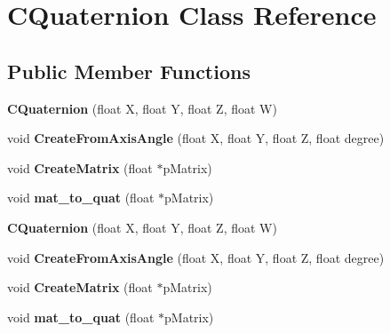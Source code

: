 \hypertarget{class_c_quaternion}{}\section{C\+Quaternion Class Reference}
\label{class_c_quaternion}
\subsection*{Public Member Functions}
\begin{DoxyCompactItemize}
\item 
\mbox{\label{class_c_quaternion_a899e2c8c9719a2548ad4c8997c6e46a7}} 
{\bfseries C\+Quaternion} (float X, float Y, float Z, float W)
\item 
\mbox{\label{class_c_quaternion_a364b4fbccd362ccf7c639317273207e3}} 
void {\bfseries Create\+From\+Axis\+Angle} (float X, float Y, float Z, float degree)
\item 
\mbox{\label{class_c_quaternion_a99304c9a8025ad232080ce25a2a3659a}} 
void {\bfseries Create\+Matrix} (float $\ast$p\+Matrix)
\item 
\mbox{\label{class_c_quaternion_a8d0875bd89387ff6958a76b35425131f}} 
void {\bfseries mat\+\_\+to\+\_\+quat} (float $\ast$p\+Matrix)
\item 
\mbox{\label{class_c_quaternion_a899e2c8c9719a2548ad4c8997c6e46a7}} 
{\bfseries C\+Quaternion} (float X, float Y, float Z, float W)
\item 
\mbox{\label{class_c_quaternion_a364b4fbccd362ccf7c639317273207e3}} 
void {\bfseries Create\+From\+Axis\+Angle} (float X, float Y, float Z, float degree)
\item 
\mbox{\label{class_c_quaternion_a99304c9a8025ad232080ce25a2a3659a}} 
void {\bfseries Create\+Matrix} (float $\ast$p\+Matrix)
\item 
\mbox{\label{class_c_quaternion_a8d0875bd89387ff6958a76b35425131f}} 
void {\bfseries mat\+\_\+to\+\_\+quat} (float $\ast$p\+Matrix)
\end{DoxyCompactItemize}
